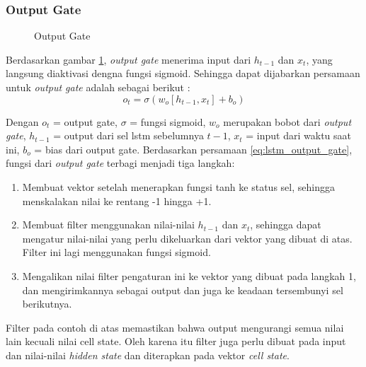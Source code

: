 \documentclass[./skripsi.tex]{subfiles}
\begin{document}
\subsubsection{Output Gate}\label{bab2:lstmoutputgate}

\begin{figure}[H]
    \centering
    \caption{Output Gate}
    \label{fig:lstm_output_gate}
\end{figure}
\par Berdasarkan gambar \ref{fig:lstm_output_gate}, \textit{output gate} menerima input dari $h_{t-1}$ dan $x_t$, yang langsung diaktivasi dengna fungsi sigmoid. Sehingga dapat dijabarkan persamaan untuk \textit{output gate} adalah sebagai berikut :
\begin{equation}
    o_t = \sigma (w_o[h_{t-1},x_t]+b_o)
    \label{eq:lstm_output_gate}
\end{equation}
\par Dengan $o_t$ = output gate, $\sigma$ = fungsi sigmoid, $w_o$ merupakan bobot dari \textit{output gate}, $h_{t-1}$ = output dari sel lstm sebelumnya $t-1$, $x_t$ = input dari waktu saat ini, $b_o$ = bias dari output gate. Berdasarkan persamaan \ref{eq:lstm_output_gate}, fungsi dari \textit{output gate} terbagi menjadi tiga langkah:
\begin{enumerate}
    \item Membuat vektor setelah menerapkan fungsi tanh ke status sel, sehingga menskalakan nilai ke rentang -1 hingga +1.
    \item Membuat filter menggunakan nilai-nilai $h_{t-1}$ dan $x_t$, sehingga dapat mengatur nilai-nilai yang perlu dikeluarkan dari vektor yang dibuat di atas. Filter ini lagi menggunakan fungsi sigmoid.
    \item  Mengalikan nilai filter pengaturan ini ke vektor yang dibuat pada langkah 1, dan mengirimkannya sebagai output dan juga ke keadaan tersembunyi sel berikutnya.
\end{enumerate}
\par Filter pada contoh di atas memastikan bahwa output mengurangi semua nilai lain kecuali nilai cell state. Oleh karena itu filter juga perlu dibuat pada input dan nilai-nilai \textit{hidden state} dan diterapkan pada vektor \textit{cell state}.
\cite{gers1999learning}
\end{document}
